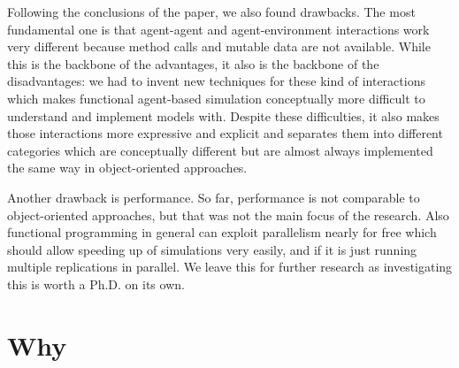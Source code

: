 Following the conclusions of the paper, we also found drawbacks. The most fundamental one is that agent-agent and agent-environment interactions work very different because method calls and mutable data are not available. While this is the backbone of the advantages, it also is the backbone of the disadvantages: we had to invent new techniques for these kind of interactions which makes functional agent-based simulation conceptually more difficult to understand and implement models with. Despite these difficulties, it also makes those interactions more expressive and explicit and separates them into different categories which are conceptually different but are almost always implemented the same way in object-oriented approaches.

Another drawback is performance. So far, performance is not comparable to object-oriented approaches, but that was not the main focus of the research. Also functional programming in general can exploit parallelism nearly for free which should allow speeding up of simulations very easily, and if it is just running multiple replications in parallel. We leave this for further research as investigating this is worth a Ph.D. on its own.

\section{Why}

